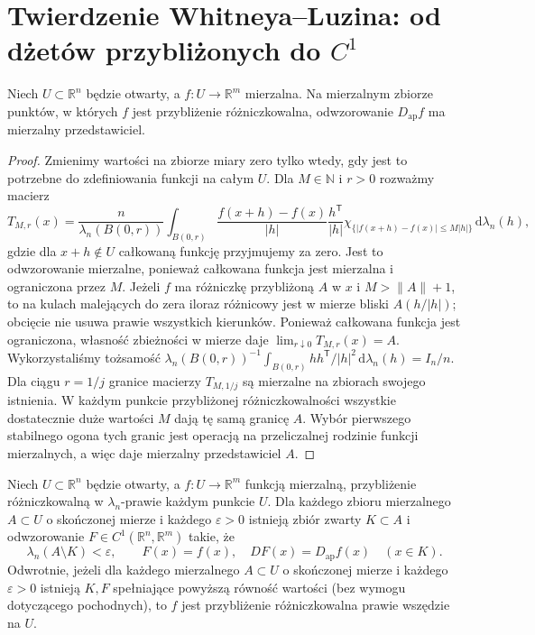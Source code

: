\section{Twierdzenie Whitneya--Luzina: od dżetów przybliżonych do $C^1$}
\begin{lemat}
\label{lem:dzety-ap-meas}
Niech $U\subset\mathbb R^n$ będzie otwarty,
a $f:U\to\mathbb R^m$ mierzalna. Na mierzalnym
zbiorze punktów, w których $f$ jest przybliżenie
różniczkowalna, odwzorowanie $D_{\mathrm{ap}}f$
ma mierzalny przedstawiciel.
\end{lemat}
\begin{proof}
Zmienimy wartości na zbiorze miary zero tylko wtedy,
gdy jest to potrzebne do zdefiniowania funkcji na całym $U$.
Dla $M\in\mathbb N$ i $r>0$ rozważmy macierz
\[
 T_{M,r}(x)=\frac{n}{\lambda_n(B(0,r))}
 \int_{B(0,r)}\frac{f(x+h)-f(x)}{|h|}
 \frac{h^{\mathsf T}}{|h|}
 \chi_{\{|f(x+h)-f(x)|\le M|h|\}}
 \,\mathrm d\lambda_n(h),
\]
gdzie dla $x+h\notin U$ całkowaną funkcję przyjmujemy za zero.
Jest to odwzorowanie mierzalne, ponieważ całkowana funkcja
jest mierzalna i ograniczona przez $M$.
Jeżeli $f$ ma różniczkę przybliżoną $A$ w $x$ i
$M>\|A\|+1$, to na kulach malejących do zera
iloraz różnicowy jest w mierze bliski
$A(h/|h|)$; obcięcie nie usuwa prawie wszystkich
kierunków. Ponieważ całkowana funkcja jest ograniczona,
własność zbieżności w mierze daje
$\lim_{r\downarrow0}T_{M,r}(x)=A$.
Wykorzystaliśmy tożsamość
$\lambda_n(B(0,r))^{-1}\int_{B(0,r)}
 hh^{\mathsf T}/|h|^2\,\mathrm d\lambda_n(h)=I_n/n$.
Dla ciągu $r=1/j$ granice macierzy $T_{M,1/j}$ są
mierzalne na zbiorach swojego istnienia. W każdym punkcie
przybliżonej różniczkowalności wszystkie dostatecznie
duże wartości $M$ dają tę samą granicę $A$.
Wybór pierwszego stabilnego ogona tych granic jest
operacją na przeliczalnej rodzinie funkcji mierzalnych,
a więc daje mierzalny przedstawiciel $A$.
\end{proof}

\begin{twierdzenie}
\label{thm:dzety-whitney-lusin}
Niech $U\subset\mathbb R^n$ będzie otwarty,
a $f:U\to\mathbb R^m$ funkcją mierzalną,
przybliżenie różniczkowalną w $\lambda_n$-prawie każdym
punkcie $U$. Dla każdego zbioru mierzalnego $A\subset U$
o skończonej mierze i każdego $\varepsilon>0$ istnieją
zbiór zwarty $K\subset A$ i odwzorowanie
$F\in C^1(\mathbb R^n,\mathbb R^m)$ takie, że
\[
 \lambda_n(A\setminus K)<\varepsilon,
 \qquad F(x)=f(x),\quad DF(x)=D_{\mathrm{ap}}f(x)
 \quad (x\in K).
\]
Odwrotnie, jeżeli dla każdego mierzalnego $A\subset U$
o skończonej mierze i każdego $\varepsilon>0$ istnieją
$K,F$ spełniające powyższą równość wartości (bez wymogu
dotyczącego pochodnych), to $f$ jest przybliżenie
różniczkowalna prawie wszędzie na $U$.
\end{twierdzenie}

